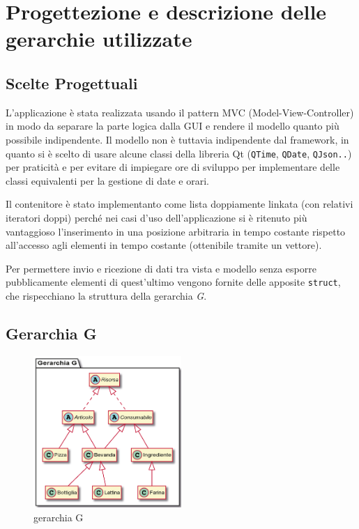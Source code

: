 \documentclass[
  10pt,
]{article}
\begin{document}
\hypertarget{progettezione-e-descrizione-delle-gerarchie-utilizzate}{%
\section{Progettezione e descrizione delle gerarchie
utilizzate}\label{progettezione-e-descrizione-delle-gerarchie-utilizzate}}

\hypertarget{scelte-progettuali}{%
\subsection{Scelte Progettuali}\label{scelte-progettuali}}

L'applicazione è stata realizzata usando il pattern MVC
(Model-View-Controller) in modo da separare la parte logica dalla GUI e
rendere il modello quanto più possibile indipendente. Il modello non è
tuttavia indipendente dal framework, in quanto si è scelto di usare
alcune classi della libreria Qt (\texttt{QTime}, \texttt{QDate},
\texttt{QJson..}) per praticità e per evitare di impiegare ore di
sviluppo per implementare delle classi equivalenti per la gestione di
date e orari.

Il contenitore è stato implementanto come lista doppiamente linkata (con
relativi iteratori doppi) perché nei casi d'uso dell'applicazione si è
ritenuto più vantaggioso l'inserimento in una posizione arbitraria in
tempo costante rispetto all'accesso agli elementi in tempo costante
(ottenibile tramite un vettore).

Per permettere invio e ricezione di dati tra vista e modello senza
esporre pubblicamente elementi di quest'ultimo vengono fornite delle
apposite \texttt{struct}, che rispecchiano la struttura della gerarchia
\emph{G}.

\hypertarget{gerarchia-g}{%
\subsection{Gerarchia G}\label{gerarchia-g}}

\begin{figure}
\centering
\includegraphics[width=0.5\textwidth,height=\textheight]{./gerarchiaG.png}
\caption{gerarchia G}
\end{figure}
\end{document}
